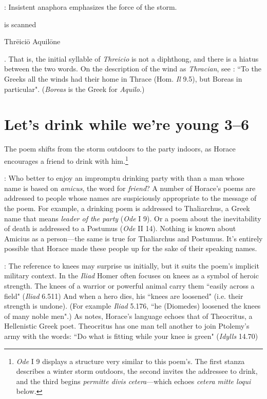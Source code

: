 : Insistent anaphora emphasizes the force of the storm.


 is scanned \begin{metrica}Thr\=e\-ic\-i\=o \-Aqu\-il\=on\-e\end{metrica}.  That is, the initial syllable of \textit{Threicio} is not a diphthong, and there is a hiatus between the two words.  On the description of the wind as \textit{Thracian}, see \citet[257]{nh1989}: ``To the Greeks all the winds had their home in Thrace (Hom. \textit{Il} 9.5), but Boreas in particular".  (\textit{Boreas} is the Greek for \textit{Aquilo}.)


\section*{Let's drink while we're young 3--6}

The poem shifts from the storm outdoors to the party indoors, as Horace encourages a friend to drink with him.\footnote{\textit{Ode} I 9 displays a structure very similar to this poem's.  The first stanza describes a winter storm outdoors, the second invites the addressee to drink, and the third begins \textit{permitte divis cetera}---which echoes \textit{cetera mitte loqui} below.}


: Who better to enjoy an impromptu drinking party with than a man whose name is based on \textit{amicus}, the word for \textit{friend}?  A number of Horace's poems are addressed to people whose names are suspiciously appropriate to the message of the poem.  For example,  a drinking poem is addressed to Thaliarchus, a Greek name that means \textit{leader of the party} (\textit{Ode} I 9).  Or a poem about the inevitability of death is addressed to a Postumus (\textit{Ode} II 14).  Nothing is known about Amicius as a person---the same is true for Thaliarchus and Postumus.  It's entirely possible that Horace made these people up for the sake of their speaking names.


: The reference to knees may surprise us initially, but it suits the poem's implicit military context.  In the \textit{Iliad} Homer often focuses on knees as a symbol of heroic strength.  The knees of a warrior or powerful animal carry them ``easily across a field" (\textit{Iliad} 6.511)  And when a hero dies, his ``knees are loosened" (i.e. their strength is undone).  (For example \textit{Iliad} 5.176, ``he (Diomedes) loosened the knees of many noble men".)  As \citet[216--217]{mankin1995} notes, Horace's language echoes that of Theocritus, a Hellenistic Greek poet. Theocritus has one man tell another to join Ptolemy's army with the words: ``Do what is fitting while your knee is green" (\textit{Idylls} 14.70)

